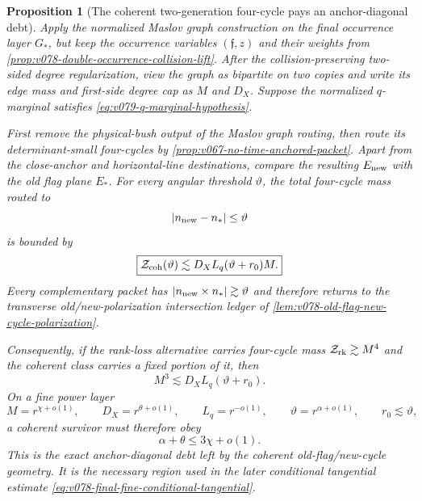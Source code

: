 \documentclass[10pt]{article}
\newtheorem{proposition}[theorem]{Proposition}
\begin{document}
\begin{proposition}[The coherent two-generation four-cycle pays an anchor-diagonal debt]
\label{prop:v079-coherent-four-cycle-anchor-debt}
Apply the normalized Maslov graph construction on the final occurrence layer
\(G_*\), but keep the occurrence variables \((\mathfrak f,z)\) and their weights from
\cref{prop:v078-double-occurrence-collision-lift}.  After the collision-preserving two-sided degree
regularization, view the graph as bipartite on two copies and write its edge mass and first-side
degree cap as \(M\) and \(D_X\).  Suppose the normalized \(q\)-marginal satisfies
\eqref{eq:v079-q-marginal-hypothesis}.

First remove the physical-bush output of the Maslov graph routing, then route its
determinant-small four-cycles by
\cref{prop:v067-no-time-anchored-packet}.  Apart from the close-anchor and horizontal-line
destinations, compare the resulting \(E_{\rm new}\) with the old flag plane \(E_*\).  For every
angular threshold \(\vartheta\), the total four-cycle mass routed to
\[
|n_{\rm new}-n_*|\le\vartheta
\]
is bounded by
\begin{equation}
\label{eq:v079-coherent-four-cycle-bound}
\boxed{
\mathcal Z_{\rm coh}(\vartheta)
\lesssim
D_XL_q(\vartheta+r_0)M.
}
\end{equation}
Every complementary packet has
\(|n_{\rm new}\times n_*|\gtrsim\vartheta\) and therefore returns to the transverse
old/new-polarization intersection ledger of
\cref{lem:v078-old-flag-new-cycle-polarization}.

Consequently, if the rank-loss alternative carries four-cycle mass
\(\mathcal Z_{\rm rk}\gtrsim M^4\) and the coherent class carries a fixed portion of it, then
\begin{equation}
\label{eq:v079-coherent-survivor-power-debt}
\boxed{
M^3
\lesssim
D_XL_q(\vartheta+r_0).
}
\end{equation}
On a fine power layer
\[
M=r^{\chi+o(1)},
\qquad
D_X=r^{\theta+o(1)},
\qquad
L_q=r^{-o(1)},
\qquad
\vartheta=r^{\alpha+o(1)},
\qquad
r_0\lesssim\vartheta,
\]
a coherent survivor must therefore obey
\begin{equation}
\label{eq:v079-coherent-anchor-exponent-region}
\boxed{\alpha+\theta\le3\chi+o(1).}
\end{equation}
This is the exact anchor-diagonal debt left by the coherent old-flag/new-cycle geometry.  It is the necessary region used in the later conditional tangential estimate
\eqref{eq:v078-final-fine-conditional-tangential}.
\end{proposition}
\end{document}
